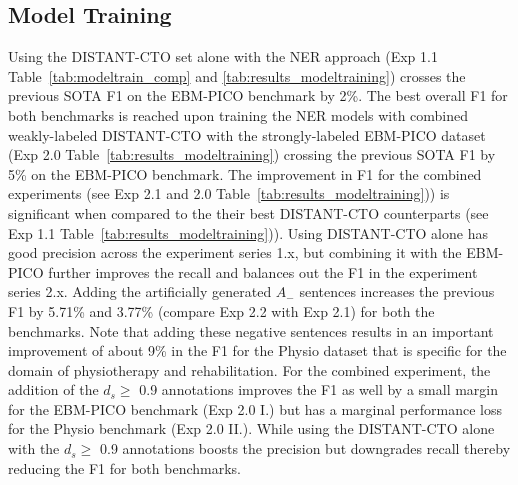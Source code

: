 \documentclass[11pt]{article}
\begin{document}
\subsection{Model Training}
\label{subsec:res_mod}
%
Using the DISTANT-CTO set alone with the NER approach (Exp 1.1 Table~\ref{tab:modeltrain_comp} and \ref{tab:results_modeltraining}) crosses the previous SOTA F1 on the EBM-PICO benchmark by 2\%.
The best overall F1 for both benchmarks is reached upon training the NER models with combined weakly-labeled DISTANT-CTO with the strongly-labeled EBM-PICO dataset (Exp 2.0 Table~\ref{tab:results_modeltraining}) crossing the previous SOTA F1 by 5\% on the EBM-PICO benchmark.
The improvement in F1 for the combined experiments (see Exp 2.1 and 2.0 Table~\ref{tab:results_modeltraining})) is significant when compared to the their best DISTANT-CTO counterparts (see Exp 1.1 Table~\ref{tab:results_modeltraining})).
Using DISTANT-CTO alone has good precision across the experiment series 1.x, but combining it with the EBM-PICO further improves the recall and balances out the F1 in the experiment series 2.x.
Adding the artificially generated $A_{-}$ sentences increases the previous F1 by 5.71\% and 3.77\% (compare Exp 2.2 with Exp 2.1) for both the benchmarks.
Note that adding these negative sentences results in an important improvement of about 9\% in the F1 for the Physio dataset that is specific for the domain of physiotherapy and rehabilitation.
For the combined experiment, the addition of the $d_s \geq$ 0.9 annotations improves the F1 as well by a small margin for the EBM-PICO benchmark (Exp 2.0 I.) but has a marginal performance loss for the Physio benchmark (Exp 2.0 II.).
While using the DISTANT-CTO alone with the $d_s \geq$ 0.9 annotations boosts the precision but downgrades recall thereby reducing the F1 for both benchmarks.
%
%
\setlength{\tabcolsep}{4pt} 
\renewcommand{\arraystretch}{1.0}
\end{document}
